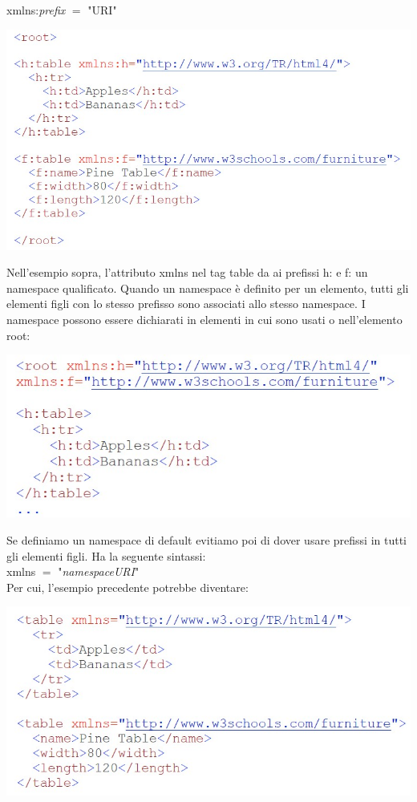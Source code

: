 xmlns:\emph{prefix} $=$ "URI"
\begin{center}
    \includegraphics[scale=0.4]{Images/TecnologieWeb/5/furniture.jpg}
\end{center}
Nell'esempio sopra, l'attributo xmlns nel tag table da ai prefissi h: e f: un namespace qualificato. Quando un namespace è definito per un elemento, tutti gli elementi figli con lo stesso prefisso sono associati allo stesso namespace. I namespace possono essere dichiarati in elementi in cui sono usati o nell'elemento root:
\begin{center}
    \includegraphics[scale=0.4]{Images/TecnologieWeb/5/xmlns.jpg}
\end{center}

Se definiamo un namespace di default evitiamo poi di dover usare prefissi in tutti gli elementi figli. Ha la seguente sintassi:\\

xmlns $=$ "\emph{namespaceURI}"\\

Per cui, l'esempio precedente potrebbe diventare:

\begin{center}
    \includegraphics[scale=0.4]{Images/TecnologieWeb/5/TableXlmns.jpg}
\end{center}

